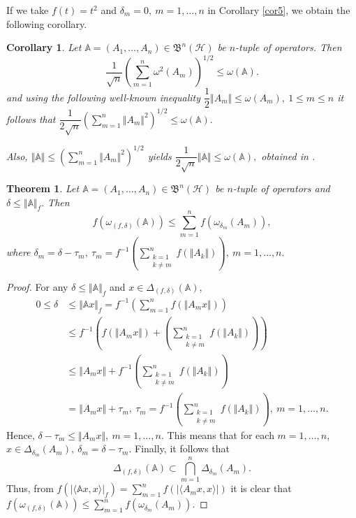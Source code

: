 \documentclass[12pt]{article}
\newtheorem{theorem}{Theorem}
\newtheorem{corollary}{Corollary}
\begin{document}
If we take $ f(t)=t^{2} $ and $ \delta_{m}=0, \ m=1,\ldots, n $ in Corollary \ref{cor5}, we obtain the following corollary.
\begin{corollary}
\label{cor6}
Let $  \mathbb{A} = (A_1, \ldots, A_n) \in \mathfrak{B}^{n}(\mathcal{H})$ be $n$-tuple of operators. Then
\[
\dfrac{1}{\sqrt{n}}\left( \sum\limits_{m=1}^{n}\omega^{2}(A_{m}) \right)^{1/2} \leq \omega (\mathbb{A}).
\]
and using the following well-known inequality
\(
\dfrac{1}{2}\Vert A_{m} \Vert \leq \omega (A_{m}), \ 1\leq m \leq n
\)
it follows that
\(
\dfrac{1}{2\sqrt{n}}\left( \sum\limits_{m=1}^{n}\Vert A_{m} \Vert^{2} \right)^{1/2} \leq \omega (\mathbb{A}).
\)

Also,
\(
\Vert \mathbb{A} \Vert \leq \left( \sum\limits_{m=1}^{n}\Vert A_{m} \Vert^{2} \right)^{1/2}
\)
yields
\(
\dfrac{1}{2\sqrt{n}} \Vert \mathbb{A} \Vert\leq \omega (\mathbb{A}),
\)
obtained in \textup{\cite{Muller2014}}.
\end{corollary}
\begin{theorem}
\label{thm5}
Let $  \mathbb{A} = (A_1, \ldots, A_n) \in \mathfrak{B}^{n}(\mathcal{H})$ be $n$-tuple of operators and $
\delta\leq \Vert \mathbb{A}  \Vert_{f}.$ Then
\[
f\left( \omega_{(f,\delta)}(\mathbb{A}) \right) \leq \sum\limits_{m=1}^{n}f\left( \omega_{\delta_{m}}(A_{m}) \right),
\]
where $ \delta_{m}=\delta-\tau_{m}, \ \tau_{m}=f^{-1}\left( \sum\limits_{\substack{k=1 \\ k\neq m}}^{n}f\left(  \Vert A_{k} \Vert\right)  \right) , \ m=1,\ldots, n. $
\end{theorem}
\begin{proof}  For any $ \delta\leq \Vert \mathbb{A} \Vert_{f}  $ and $ x\in \Delta_{(f,\delta)}(\mathbb{A}) $,
\begin{align*}
0 \leq \delta &\leq \Vert \mathbb{A} x \Vert_{f} = f^{-1}\left( \sum\limits_{m=1}^{n}f\left( \Vert A_{m} x\Vert \right)  \right)  \\
&\leq f^{-1}\left( f\left( \Vert A_{m} x\Vert \right)+ \left( \sum\limits_{\substack{k=1 \\ k\neq m}}^{n}f\left(  \Vert A_{k} \Vert\right)  \right) \right)  \\
&\leq \Vert A_{m} x\Vert + f^{-1}\left(\sum\limits_{\substack{k=1 \\ k\neq m}}^{n}f\left(  \Vert A_{k} \Vert\right)   \right) \\
&= \Vert A_{m} x\Vert + \tau_{m}, \ \tau_{m}=f^{-1}\left( \sum\limits_{\substack{k=1 \\ k\neq m}}^{n}f\left(  \Vert A_{k} \Vert\right)  \right) , \ m=1,\ldots, n.
\end{align*}
Hence,
\(
\delta-\tau_{m}\leq \Vert A_{m}x \Vert, \ m=1,\ldots,n.
\)
This means that for each $ m=1,\ldots,n $,
\(
x\in \Delta_{\delta_{m}}(A_{m}), \ \delta_{m}=\delta-\tau_{m}.
\)
Finally, it follows that
\[
\Delta_{(f,\delta)}(\mathbb{A})\subset\bigcap \limits_{m=1}^{n}\Delta_{\delta_{m}}(A_{m}).
\]
Thus, from
\(
f\left( \vert \langle \mathbb{A} x,x \rangle \vert_{f}  \right) = \sum\limits_{m=1}^{n} f\left( \vert \langle A_{m} x,x \rangle \vert  \right)
\)
it is clear that
\(
f\left( \omega_{(f,\delta)}(\mathbb{A}) \right) \leq \sum\limits_{m=1}^{n}f\left( \omega_{\delta_{m}}(A_{m}) \right).
\)
\end{proof}
\end{document}
